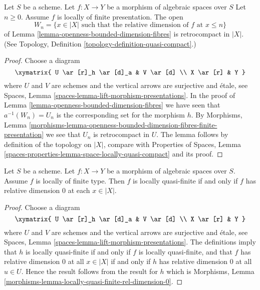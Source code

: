 \begin{lemma}
\label{lemma-openness-bounded-dimension-fibres-finite-presentation}
Let $S$ be a scheme.
Let $f : X \to Y$ be a morphism of algebraic spaces over $S$
Let $n \geq 0$. Assume $f$ is locally of finite presentation.
The open
$$
W_n = \{x \in |X|
\text{ such that the relative dimension of }f\text{ at } x \leq n\}
$$
of Lemma \ref{lemma-openness-bounded-dimension-fibres}
is retrocompact in $|X|$. (See
Topology, Definition \ref{topology-definition-quasi-compact}.)
\end{lemma}

\begin{proof}
Choose a diagram
$$
\xymatrix{
U \ar[r]_h \ar[d]_a & V \ar[d] \\
X \ar[r] & Y
}
$$
where $U$ and $V$ are schemes and the vertical arrows are surjective and
\'etale, see
Spaces, Lemma \ref{spaces-lemma-lift-morphism-presentations}.
In the proof of
Lemma \ref{lemma-openness-bounded-dimension-fibres}
we have seen that $a^{-1}(W_n) = U_n$ is the corresponding set
for the morphism $h$. By
Morphisms, Lemma
\ref{morphisms-lemma-openness-bounded-dimension-fibres-finite-presentation}
we see that $U_n$ is retrocompact in $U$.
The lemma follows by definition of the topology on $|X|$, compare with
Properties of Spaces,
Lemma \ref{spaces-properties-lemma-space-locally-quasi-compact}
and its proof.
\end{proof}

\begin{lemma}
\label{lemma-locally-quasi-finite-rel-dimension-0}
Let $S$ be a scheme.
Let $f : X \to Y$ be a morphism of algebraic spaces over $S$.
Assume $f$ is locally of finite type.
Then $f$ is locally quasi-finite if and only if $f$ has relative
dimension $0$ at each $x \in |X|$.
\end{lemma}

\begin{proof}
Choose a diagram
$$
\xymatrix{
U \ar[r]_h \ar[d]_a & V \ar[d] \\
X \ar[r] & Y
}
$$
where $U$ and $V$ are schemes and the vertical arrows are surjective and
\'etale, see
Spaces, Lemma \ref{spaces-lemma-lift-morphism-presentations}.
The definitions imply that
$h$ is locally quasi-finite if and only if $f$ is locally quasi-finite,
and that $f$ has relative dimension $0$ at all $x \in |X|$ if and
only if $h$ has relative dimension $0$ at all $u \in U$.
Hence the result follows from the result for $h$ which is
Morphisms, Lemma \ref{morphisms-lemma-locally-quasi-finite-rel-dimension-0}.
\end{proof}

